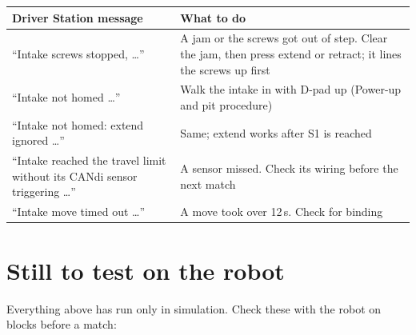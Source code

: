\documentclass[11pt]{article}
\begin{document}
\begin{xltabular}{\linewidth}{>{\raggedright\arraybackslash}p{6.2cm} L}
\toprule
\textbf{Driver Station message} & \textbf{What to do} \\
\midrule
\endhead
``Intake screws stopped, \ldots'' & A jam or the screws got out of step. Clear the jam, then press extend or retract; it lines the screws up first \\
``Intake not homed \ldots'' & Walk the intake in with D-pad up (Power-up and pit procedure) \\
``Intake not homed: extend ignored \ldots'' & Same; extend works after S1 is reached \\
``Intake reached the travel limit without its CANdi sensor triggering \ldots'' & A sensor missed. Check its wiring before the next match \\
``Intake move timed out \ldots'' & A move took over 12\,s. Check for binding \\
\bottomrule
\end{xltabular}

\section*{Still to test on the robot}

Everything above has run only in simulation. Check these with the robot on blocks before a
match:
\end{document}
